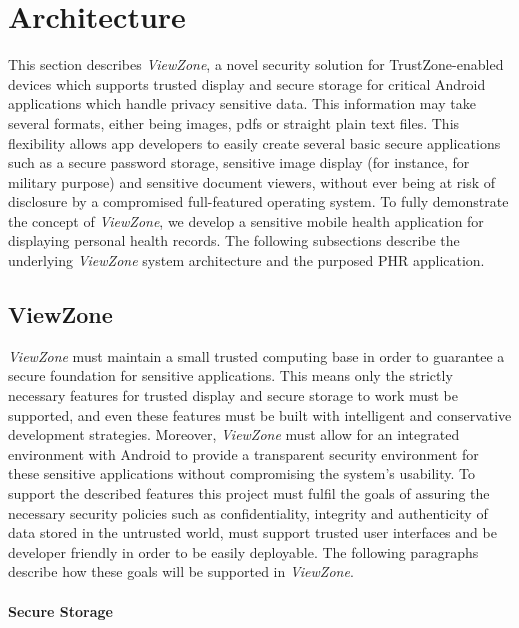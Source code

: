 
% 
% 
\section{Architecture}
\label{sec:architecture}

This section describes \emph{ViewZone}, a novel security solution for TrustZone-enabled devices which supports trusted display and secure storage for critical Android applications which handle privacy sensitive data. This information may take several formats, either being images, pdfs or straight plain text files. This flexibility allows app developers to easily create several basic secure applications such as a secure password storage, sensitive image display (for instance, for military purpose) and sensitive document viewers, without ever being at risk of disclosure by a compromised full-featured operating system. To fully demonstrate the concept of \emph{ViewZone}, we develop a sensitive mobile health application for displaying personal health records. The following subsections describe the underlying \emph{ViewZone} system architecture and the purposed \ac{PHR} application.

\subsection{ViewZone}

\emph{ViewZone} must maintain a small trusted computing base in order to guarantee a secure foundation for sensitive applications. This means only the strictly necessary features for trusted display and secure storage to work must be supported, and even these features must be built with intelligent and conservative development strategies. Moreover, \emph{ViewZone} must allow for an integrated environment with Android to provide a transparent security environment for these sensitive applications without compromising the system's usability. To support the described features this project must fulfil the goals of assuring the necessary security policies such as confidentiality, integrity and authenticity of data stored in the untrusted world, must support trusted user interfaces and be developer friendly in order to be easily deployable. The following paragraphs describe how these goals will be supported in \emph{ViewZone}.

\paragraph{\textbf{Secure Storage}}

